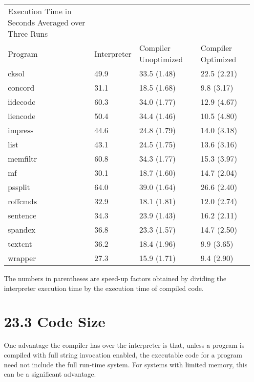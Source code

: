 \begin{center}
\tablefirsthead{}
\tablehead{}
\tabletail{}
\tablelasttail{}
\begin{supertabular}{m{3.3525598in}m{0.6143598in}m{0.7684598in}m{0.6434598in}}
 Execution Time in Seconds Averaged over Three Runs &
~
 &
~
 &
~
\\
 Program &
 Interpreter &
 Compiler \newline
Unoptimized &
 Compiler \newline
Optimized\\
 cksol  &
 49.9  &
 33.5 (1.48)  &
 22.5 (2.21) \\
 concord  &
 31.1  &
 18.5 (1.68)  &
 9.8 (3.17) \\
 iidecode  &
 60.3  &
 34.0 (1.77)  &
 12.9 (4.67) \\
 iiencode  &
 50.4  &
 34.4 (1.46)  &
 10.5 (4.80) \\
 impress  &
 44.6  &
 24.8 (1.79)  &
 14.0 (3.18) \\
 list  &
 43.1  &
 24.5 (1.75)  &
 13.6 (3.16) \\
 memfiltr  &
 60.8  &
 34.3 (1.77)  &
 15.3 (3.97) \\
 mf  &
 30.1  &
 18.7 (1.60)  &
 14.7 (2.04) \\
 pssplit  &
 64.0  &
 39.0 (1.64)  &
 26.6 (2.40) \\
 roffcmds  &
 32.9  &
 18.1 (1.81)  &
 12.0 (2.74) \\
 sentence  &
 34.3  &
 23.9 (1.43)  &
 16.2 (2.11) \\
 spandex  &
 36.8  &
 23.3 (1.57)  &
 14.7 (2.50) \\
 textcnt  &
 36.2  &
 18.4 (1.96)  &
 9.9 (3.65) \\
 wrapper  &
 27.3  &
 15.9 (1.71)  &
 9.4 (2.90) \\
\end{supertabular}
\end{center}

The numbers in parentheses are speed-up factors obtained by dividing
the interpreter execution time by the execution time of compiled code.


\section[23.3 Code Size]{23.3 Code Size}

One advantage the compiler has over the interpreter is that, unless a
program is compiled with full string invocation enabled, the
executable code for a program need not include the full run-time
system. For systems with limited memory, this can be a significant
advantage.


